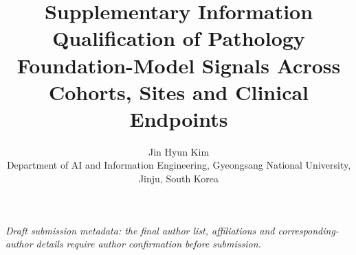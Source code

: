 \documentclass[11pt,a4paper]{article}
\title{Supplementary Information\\[0.5em]
\large Qualification of Pathology Foundation-Model Signals Across Cohorts, Sites and
Clinical Endpoints}
\author{Jin Hyun Kim\\
\small Department of AI and Information Engineering, Gyeongsang National University,
Jinju, South Korea}
\date{}
\begin{document}
\renewcommand{\thefigure}{S\arabic{figure}}
\renewcommand{\thetable}{S\arabic{table}}
\maketitle
\begin{center}
\small\textit{Draft submission metadata: the final author list, affiliations and
corresponding-author details require author confirmation before submission.}
\end{center}

\end{document}

